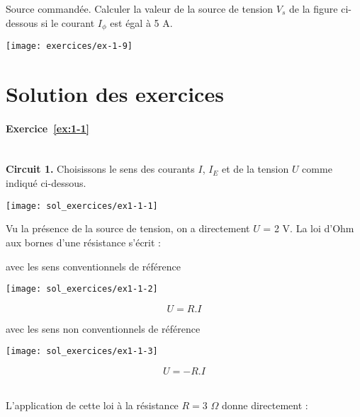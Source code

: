 \begin{exercise}{Source commandée.}
\label{ex:1-9}
Calculer la valeur de la source de tension $V_s$ de la figure ci-dessous si le courant
$I_{\phi}$ est égal à 5 A.
\begin{center}
	\texttt{[image: exercices/ex-1-9]}
\end{center}

\end{exercise}

\section{Solution des exercices}

\paragraph{Exercice~\ref{ex:1-1}}~\\
{\bf Circuit 1.} Choisissons le sens des courants $I$, $I_E$ et de la tension $U$ comme indiqué ci-dessous.
\begin{center}
	\texttt{[image: sol\_exercices/ex1-1-1]}
\end{center}
Vu la présence de la source de tension, on a directement $U$ = 2 V.
La loi d'Ohm aux bornes d'une résistance s'écrit :\\[3mm]
\begin{minipage}[c]{0.5\textwidth}
	\begin{center}
		avec les sens conventionnels de référence\\[3mm]
		\begin{center}
			\texttt{[image: sol\_exercices/ex1-1-2]}
		\end{center}
	\end{center}
	\[U=R.I\]
\end{minipage}
\begin{minipage}[c]{0.5\textwidth}
	\begin{center}
		avec les sens non conventionnels de référence\\[3mm]
		\begin{center}
			\texttt{[image: sol\_exercices/ex1-1-3]}
		\end{center}
	\end{center}
	\[U=-R.I \]
\end{minipage}\\[3mm]
L'application de cette loi à la résistance $R=3\, \, \Omega$ donne
directement :
